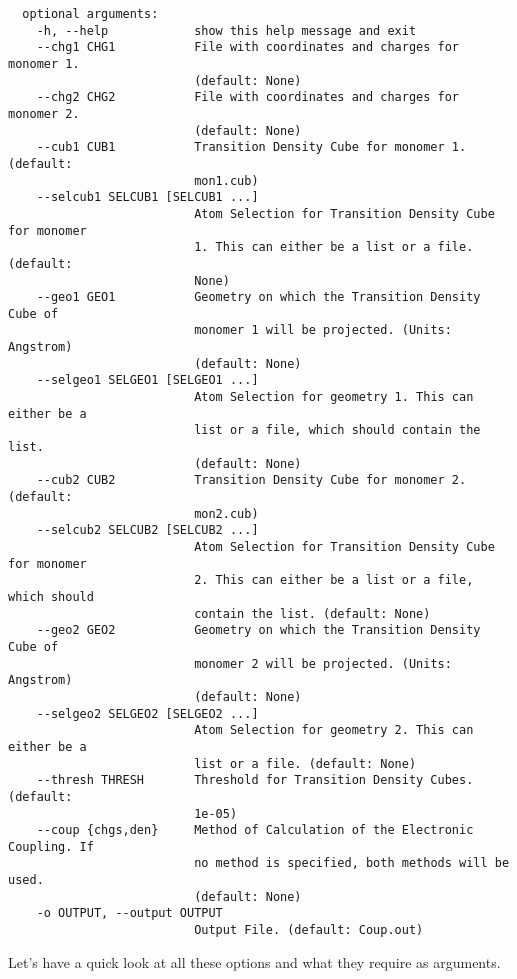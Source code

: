 \documentclass[a4paper]{article}
\begin{document}
\begin{verbatim}
  optional arguments:
    -h, --help            show this help message and exit
    --chg1 CHG1           File with coordinates and charges for monomer 1.
                          (default: None)
    --chg2 CHG2           File with coordinates and charges for monomer 2.
                          (default: None)
    --cub1 CUB1           Transition Density Cube for monomer 1. (default:
                          mon1.cub)
    --selcub1 SELCUB1 [SELCUB1 ...]
                          Atom Selection for Transition Density Cube for monomer
                          1. This can either be a list or a file. (default:
                          None)
    --geo1 GEO1           Geometry on which the Transition Density Cube of
                          monomer 1 will be projected. (Units: Angstrom)
                          (default: None)
    --selgeo1 SELGEO1 [SELGEO1 ...]
                          Atom Selection for geometry 1. This can either be a
                          list or a file, which should contain the list.
                          (default: None)
    --cub2 CUB2           Transition Density Cube for monomer 2. (default:
                          mon2.cub)
    --selcub2 SELCUB2 [SELCUB2 ...]
                          Atom Selection for Transition Density Cube for monomer
                          2. This can either be a list or a file, which should
                          contain the list. (default: None)
    --geo2 GEO2           Geometry on which the Transition Density Cube of
                          monomer 2 will be projected. (Units: Angstrom)
                          (default: None)
    --selgeo2 SELGEO2 [SELGEO2 ...]
                          Atom Selection for geometry 2. This can either be a
                          list or a file. (default: None)
    --thresh THRESH       Threshold for Transition Density Cubes. (default:
                          1e-05)
    --coup {chgs,den}     Method of Calculation of the Electronic Coupling. If
                          no method is specified, both methods will be used.
                          (default: None)
    -o OUTPUT, --output OUTPUT
                          Output File. (default: Coup.out)

\end{verbatim}

Let's have a quick look at all these options and what they require as arguments.
\end{document}
